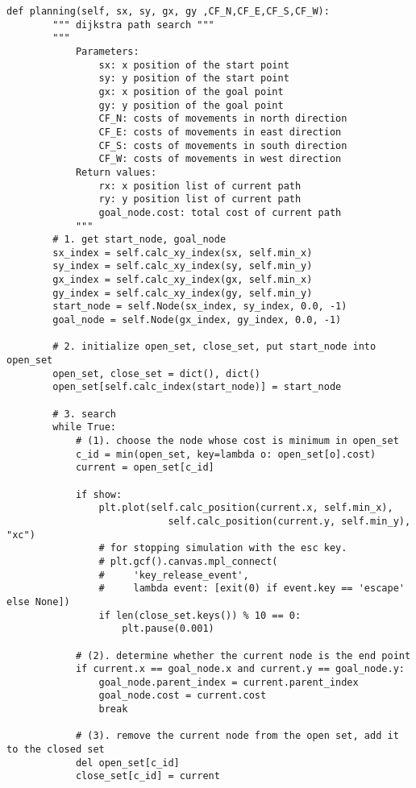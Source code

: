 \begin{lstlisting}[caption=Function for finding the efficient path under a given speed (\autoref{Pathfinding}), label=moddijk]
    def planning(self, sx, sy, gx, gy ,CF_N,CF_E,CF_S,CF_W):
        """ dijkstra path search """
        """ 
            Parameters:
                sx: x position of the start point
                sy: y position of the start point
                gx: x position of the goal point
                gy: y position of the goal point
                CF_N: costs of movements in north direction
                CF_E: costs of movements in east direction
                CF_S: costs of movements in south direction
                CF_W: costs of movements in west direction
            Return values:
                rx: x position list of current path
                ry: y position list of current path
                goal_node.cost: total cost of current path
            """
        # 1. get start_node, goal_node
        sx_index = self.calc_xy_index(sx, self.min_x)
        sy_index = self.calc_xy_index(sy, self.min_y)
        gx_index = self.calc_xy_index(gx, self.min_x)
        gy_index = self.calc_xy_index(gy, self.min_y)
        start_node = self.Node(sx_index, sy_index, 0.0, -1)
        goal_node = self.Node(gx_index, gy_index, 0.0, -1)

        # 2. initialize open_set, close_set, put start_node into open_set
        open_set, close_set = dict(), dict()
        open_set[self.calc_index(start_node)] = start_node

        # 3. search
        while True:
            # (1). choose the node whose cost is minimum in open_set
            c_id = min(open_set, key=lambda o: open_set[o].cost)
            current = open_set[c_id]
            
            if show: 
                plt.plot(self.calc_position(current.x, self.min_x),
                            self.calc_position(current.y, self.min_y), "xc")
                # for stopping simulation with the esc key.
                # plt.gcf().canvas.mpl_connect(
                #     'key_release_event',
                #     lambda event: [exit(0) if event.key == 'escape' else None])
                if len(close_set.keys()) % 10 == 0:
                    plt.pause(0.001)

            # (2). determine whether the current node is the end point
            if current.x == goal_node.x and current.y == goal_node.y:
                goal_node.parent_index = current.parent_index
                goal_node.cost = current.cost
                break

            # (3). remove the current node from the open set, add it to the closed set
            del open_set[c_id]
            close_set[c_id] = current


\end{lstlisting}
